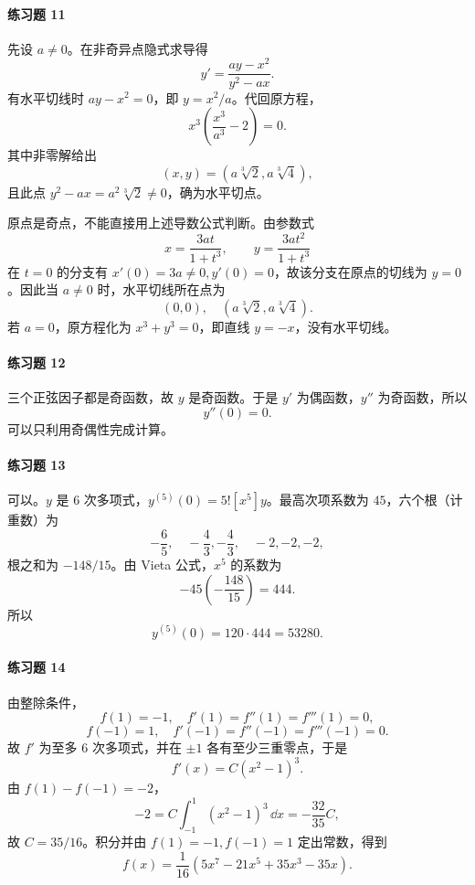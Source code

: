 \paragraph{练习题 11}
\begin{xsolution}
先设 $a\ne0$。在非奇异点隐式求导得
\[
  y'=\frac{ay-x^2}{y^2-ax}.
\]
有水平切线时 $ay-x^2=0$，即 $y=x^2/a$。代回原方程，
\[
  x^3\left(\frac{x^3}{a^3}-2\right)=0.
\]
其中非零解给出
\[
  (x,y)=(a\sqrt[3]{2},a\sqrt[3]{4}),
\]
且此点 $y^2-ax=a^2\sqrt[3]{2}\ne0$，确为水平切点。

原点是奇点，不能直接用上述导数公式判断。由参数式
\[
  x=\frac{3at}{1+t^3},\qquad y=\frac{3at^2}{1+t^3}
\]
在 $t=0$ 的分支有 $x'(0)=3a\ne0,y'(0)=0$，故该分支在原点的切线为 $y=0$。因此当 $a\ne0$ 时，水平切线所在点为
\[
  \boxed{(0,0),\quad(a\sqrt[3]{2},a\sqrt[3]{4})}.
\]
若 $a=0$，原方程化为 $x^3+y^3=0$，即直线 $y=-x$，没有水平切线。
\end{xsolution}

\paragraph{练习题 12}
\begin{xsolution}
三个正弦因子都是奇函数，故 $y$ 是奇函数。于是 $y'$ 为偶函数，$y''$ 为奇函数，所以
\[
  \boxed{y''(0)=0}.
\]
可以只利用奇偶性完成计算。
\end{xsolution}

\paragraph{练习题 13}
\begin{xsolution}
可以。$y$ 是 6 次多项式，$y^{(5)}(0)=5![x^5]y$。最高次项系数为 $45$，六个根（计重数）为
\[
  -\frac65,\quad-\frac43,-\frac43,\quad-2,-2,-2,
\]
根之和为 $-148/15$。由 Vieta 公式，$x^5$ 的系数为
\[
  -45\left(-\frac{148}{15}\right)=444.
\]
所以
\[
  \boxed{y^{(5)}(0)=120\cdot444=53280}.
\]
\end{xsolution}

\paragraph{练习题 14}
\begin{xsolution}
由整除条件，
\[
  f(1)=-1,\quad f'(1)=f''(1)=f'''(1)=0,
\]
\[
  f(-1)=1,\quad f'(-1)=f''(-1)=f'''(-1)=0.
\]
故 $f'$ 为至多 6 次多项式，并在 $\pm1$ 各有至少三重零点，于是
\[
  f'(x)=C(x^2-1)^3.
\]
由 $f(1)-f(-1)=-2$，
\[
  -2=C\int_{-1}^1(x^2-1)^3\,\dd x
  =-\frac{32}{35}C,
\]
故 $C=35/16$。积分并由 $f(1)=-1,f(-1)=1$ 定出常数，得到
\[
  \boxed{f(x)=\frac1{16}(5x^7-21x^5+35x^3-35x)}.
\]
\end{xsolution}


